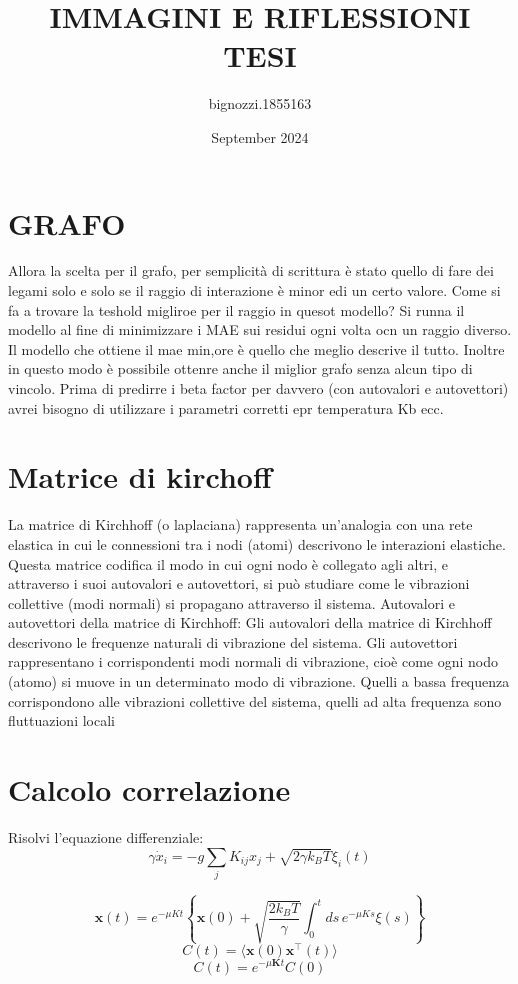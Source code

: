 \documentclass{article}
\title{IMMAGINI E RIFLESSIONI TESI}
\author{bignozzi.1855163 }
\date{September 2024}
\begin{document}
\maketitle

\section{GRAFO}
Allora la scelta per il grafo, per semplicità di scrittura è stato quello di fare dei legami solo e solo se il raggio di interazione è minor edi un certo valore. Come si fa a trovare la teshold migliroe per il raggio in quesot modello?
Si runna il modello al fine di minimizzare i MAE sui residui ogni volta ocn un raggio diverso. Il modello che ottiene il mae min,ore è quello che meglio descrive il tutto.
Inoltre in questo modo è possibile ottenre anche il miglior grafo senza alcun tipo di vincolo.
Prima di predirre i beta factor per davvero (con autovalori e autovettori) avrei bisogno di utilizzare i parametri corretti epr temperatura Kb ecc.

\section{Matrice di kirchoff}
La matrice di Kirchhoff (o laplaciana) rappresenta un'analogia con una rete elastica in cui le connessioni tra i nodi (atomi) descrivono le interazioni elastiche. Questa matrice codifica il modo in cui ogni nodo è collegato agli altri, e attraverso i suoi autovalori e autovettori, si può studiare come le vibrazioni collettive (modi normali) si propagano attraverso il sistema.
Autovalori e autovettori della matrice di Kirchhoff:
Gli autovalori della matrice di Kirchhoff descrivono le frequenze naturali di vibrazione del sistema.
Gli autovettori rappresentano i corrispondenti modi normali di vibrazione, cioè come ogni nodo (atomo) si muove in un determinato modo di vibrazione.
Quelli a bassa frequenza corrispondono alle vibrazioni collettive del sistema, quelli ad alta frequenza sono fluttuazioni locali 
\section{Calcolo correlazione}
Risolvi l'equazione differenziale:
\begin{equation}
    \gamma \dot{x}_i = -g \sum_j K_{ij} x_j + \sqrt{2 \gamma k_B T} \xi_i(t)
    \end{equation}
    
\begin{equation}
    \mathbf{x}(t) = e^{-\mu K t} \left\{ \mathbf{x}(0) + \sqrt{\frac{2k_B T}{\gamma}} \int_0^t ds \, e^{-\mu K s} \xi(s) \right\}
    \end{equation}
\begin{equation}
    C(t) = \langle \mathbf{x}(0) \mathbf{x}^\top(t) \rangle
    \end{equation}
\begin{equation}
    C(t) = e^{-\mu \mathbf{K} t} C(0)
    \end{equation}
        
\end{document}
